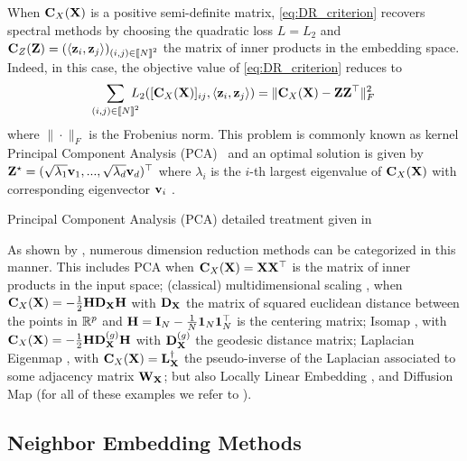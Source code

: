 When ${\mathbf{C}}_{X}({\mathbf{X}})$ is a positive semi-definite matrix, \cref{eq:DR_criterion}
recovers spectral methods by choosing the quadratic loss $L = L_2$ and ${\mathbf{C}}_{Z}({\mathbf{Z}}) = (\langle {\mathbf{z}}_i, {\mathbf{z}}_j \rangle)_{(i,j) \in {[\![N]\!]}^2}$ the matrix of inner
products in the embedding space. Indeed, in this case, the objective value of \cref{eq:DR_criterion}
reduces to
\begin{equation*}
\label{eq:spectral_method}
	\sum_{(i,j) \in {[\![N]\!]}^2} \!\!\!\!\! L_2([{\mathbf{C}}_{X}({\mathbf{X}})]_{ij}, \langle {\mathbf{z}}_i, {\mathbf{z}}_j \rangle) = \| {\mathbf{C}}_{X}({\mathbf{X}}) - {\mathbf{Z}}{\mathbf{Z}}^\top \|^2_F\,
\end{equation*}
where $\|\cdot\|_F$ is the Frobenius norm. This problem is commonly known as kernel Principal Component Analysis (PCA)~\cite{scholkopf1997kernel}
 and an optimal solution is given by
${\mathbf{Z}}^\star = (\sqrt{\lambda_1} {\mathbf{v}}_{1}, ..., \sqrt{\lambda_d} {\mathbf{v}}_{d})^\top$ where $\lambda_i$ is the $i$-th
largest eigenvalue of ${\mathbf{C}}_{X}({\mathbf{X}})$ with corresponding eigenvector ${\mathbf{v}}_{i}$ 
\cite{eckart1936approximation}.  


\begin{rem1}{Principal Component Analysis (PCA)}
detailed treatment given in 
\end{rem1}



As shown by \citet{ham2004kernel, ghojogh2021unified}, numerous dimension reduction methods can be categorized in this manner.
This includes PCA when ${\mathbf{C}}_{X}({\mathbf{X}}) = {\mathbf{X}}{\mathbf{X}}^\top$ is the matrix of inner products in the input space; (classical) multidimensional scaling \cite{borg2005modern}, when ${\mathbf{C}}_{X}({\mathbf{X}}) = -\frac{1}{2} {\mathbf{H}} {\mathbf{D}}_{\mathbf{X}} {\mathbf{H}}$ with ${\mathbf{D}}_{\mathbf{X}}$ the matrix of squared euclidean distance between the points in $\mathbb{R}^{p}$ and ${\mathbf{H}} = {\mathbf{I}}_N - \frac{1}{N} \bm{1}_N \bm{1}_N^\top$ is the centering matrix; Isomap \cite{tenenbaum2000global}, with ${\mathbf{C}}_{X}({\mathbf{X}}) = -\frac{1}{2} {\mathbf{H}} {\mathbf{D}}_{\mathbf{X}}^{(g)} {\mathbf{H}}$ with ${\mathbf{D}}_{\mathbf{X}}^{(g)}$ the geodesic distance matrix; Laplacian Eigenmap
\cite{belkin2003laplacian}, with ${\mathbf{C}}_{X}({\mathbf{X}}) = {\mathbf{L}}_{\mathbf{X}}^{\dagger}$ the pseudo-inverse of the Laplacian associated to some adjacency matrix ${\mathbf{W}}_{\mathbf{X}}$; but also Locally Linear Embedding \cite{roweis2000nonlinear}, and Diffusion Map \cite{coifman2006diffusion} (for all of these examples we refer to \citealt[Table 1]{ghojogh2021unified}).


\subsection{Neighbor Embedding Methods}

